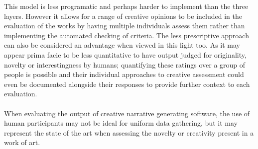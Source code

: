 \documentclass[letterpaper]{article}
\begin{document}
This model is less programatic and perhaps harder to implement than the three layers. However it allows for a range of creative opinions to be included in the evaluation of the works by having multiple individuals assess them rather than implementing the automated checking of criteria. The less prescriptive approach can also be considered an advantage when viewed in this light too. As it may appear prima facie to be less quantitative to have output judged for originality, novelty or interestingness by humans; quantifying these ratings over a group of people is possible and their individual approaches to creative assessment could even be documented alongside their responses to provide further context to each evaluation.\\
\\When evaluating the output of creative narrative generating software, the use of human participants may not be ideal for uniform data gathering,  but it may represent the state of the art when assessing the novelty or creativity present in a work of art.\\



\end{document}
